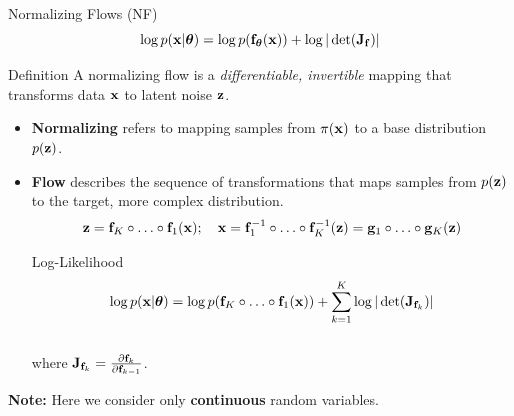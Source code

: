 \documentclass{beamer}
\begin{document}
\begin{frame}{Normalizing Flows (NF)}
	\vspace{-0.3cm}
	\[
	\log p(\mathbf{x}|\boldsymbol{\theta}) = \log p(\mathbf{f}_{\boldsymbol{\theta}}(\mathbf{x})) + \log |\det (\mathbf{J}_{\mathbf{f}})|
	\]
	\vspace{-0.4cm}
	\begin{block}{Definition}
		A normalizing flow is a \textit{differentiable, invertible} mapping that transforms data $\mathbf{x}$ to latent noise $\mathbf{z}$.
	\end{block}
	\begin{itemize}
		\item \textbf{Normalizing} refers to mapping samples from $\pi(\mathbf{x})$ to a base distribution $p(\mathbf{z})$.
		\item \textbf{Flow} describes the sequence of transformations that maps samples from $p(\mathbf{z})$ to the target, more complex distribution.
		\[
		\mathbf{z} = \mathbf{f}_K \circ \ldots \circ \mathbf{f}_1(\mathbf{x}); \quad \mathbf{x} = \mathbf{f}_1^{-1} \circ \ldots \circ \mathbf{f}_K^{-1} (\mathbf{z}) = \mathbf{g}_1 \circ \ldots \circ \mathbf{g}_K(\mathbf{z}) 
		\] 
		\vspace{-0.4cm}
		\begin{block}{Log-Likelihood}
			\vspace{-0.5cm}
			\[
			\log p(\mathbf{x}|\boldsymbol{\theta}) = \log p(\mathbf{f}_K \circ \ldots \circ \mathbf{f}_1(\mathbf{x})) + \sum_{k=1}^K \log |\det (\mathbf{J}_{\mathbf{f}_k})|
			\]
			\vspace{-0.4cm} \\
			where $\mathbf{J}_{\mathbf{f}_k} = \frac{\partial \mathbf{f}_k}{\partial \mathbf{f}_{k-1}}$.
		\end{block}
	\end{itemize}
	\textbf{Note:} Here we consider only \textbf{continuous} random variables.
\end{frame}
\end{document}
